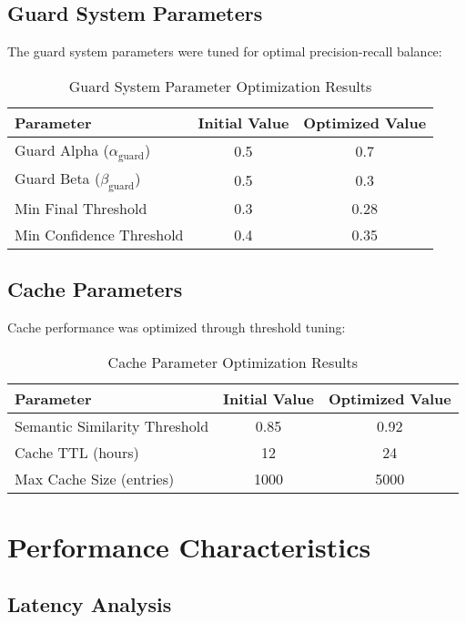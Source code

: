 \documentclass[11pt,a4paper]{article}
\begin{document}
\subsection{Guard System Parameters}

The guard system parameters were tuned for optimal precision-recall balance:

\begin{table}[h]
\centering
\begin{tabular}{@{}lcc@{}}
\toprule
Parameter & Initial Value & Optimized Value \\
\midrule
Guard Alpha ($\alpha_{\text{guard}}$) & 0.5 & 0.7 \\
Guard Beta ($\beta_{\text{guard}}$) & 0.5 & 0.3 \\
Min Final Threshold & 0.3 & 0.28 \\
Min Confidence Threshold & 0.4 & 0.35 \\
\bottomrule
\end{tabular}
\caption{Guard System Parameter Optimization Results}
\end{table}

\subsection{Cache Parameters}

Cache performance was optimized through threshold tuning:

\begin{table}[h]
\centering
\begin{tabular}{@{}lcc@{}}
\toprule
Parameter & Initial Value & Optimized Value \\
\midrule
Semantic Similarity Threshold & 0.85 & 0.92 \\
Cache TTL (hours) & 12 & 24 \\
Max Cache Size (entries) & 1000 & 5000 \\
\bottomrule
\end{tabular}
\caption{Cache Parameter Optimization Results}
\end{table}

\section{Performance Characteristics}

\subsection{Latency Analysis}
\end{document}
